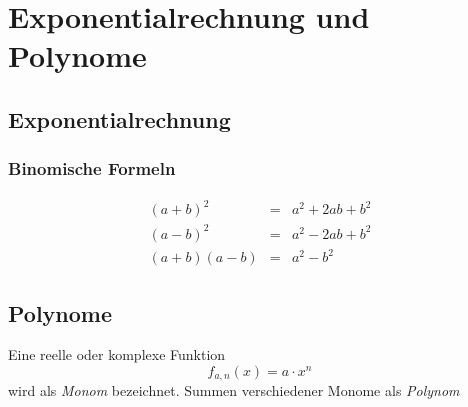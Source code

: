 

\chapter{Exponentialrechnung und Polynome}


\section{Exponentialrechnung}

\subsection{Binomische Formeln}

\begin{eqnarray}
(a+b)^2 &=& a^2 +2ab +b^2 \label{eq:binom1} \\
(a-b)^2 &=& a^2 -2ab +b^2 \label{eq:binom2} \\
(a+b)(a-b) &=& a^2 -b^2 \label{eq:binom3}
\end{eqnarray}


\section{Polynome}

\begin{definition}
Eine reelle oder komplexe Funktion
\[ f_{a,n}(x) = a\cdot x^n  \]
wird als \textsl{Monom} bezeichnet. Summen verschiedener Monome als \textsl{Polynom}
\end{definition}